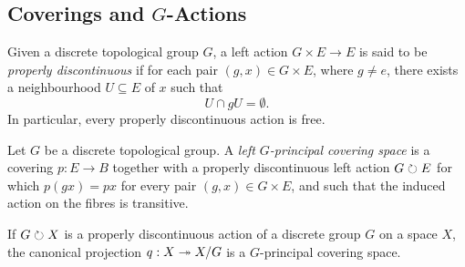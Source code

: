 

\subsection{Coverings and \texorpdfstring{\(G\)}{G}-Actions}

\begin{definition}
\label{def:properly-discontinuous-action}
Given a discrete topological group \(G\), a left action \(G \times E \to E\) is
said to be \emph{properly discontinuous} if for each pair
\((g, x) \in G \times E\), where \(g \neq e\), there exists a neighbourhood
\(U \subseteq E\) of \(x\) such that
\[
U \cap g U = \emptyset.
\]
In particular, every properly discontinuous action is free.
\end{definition}

\begin{definition}
\label{def:G-principal-covering}
Let \(G\) be a discrete topological group. A \emph{left \(G\)-principal covering
  space} is a covering \(p: E \to B\) together with a properly discontinuous
left action \(G \circlearrowright E\) for which \(p(g x) = p x\) for every pair
\((g, x) \in G \times E\), and such that the induced action on the fibres is
transitive.
\end{definition}

\begin{proposition}
\label{prop:properly-discontinuous-induces-covering}
If \(G \circlearrowright X\) is a properly discontinuous action of a discrete group \(G\)
on a space \(X\), the canonical projection \(q: X \twoheadrightarrow X/G\) is a
\(G\)-principal covering space.
\end{proposition}

